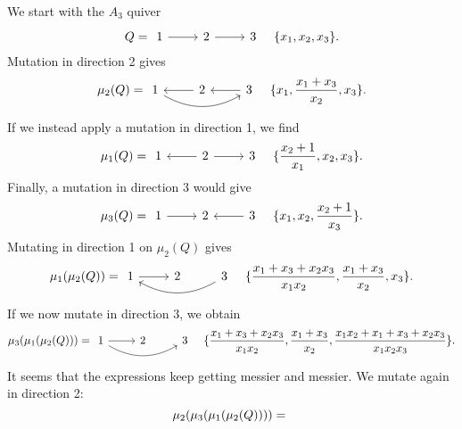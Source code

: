\documentclass{article}
\begin{document}
\begin{example}
	We start with the $A_3$ quiver
	\begin{equation*}
		Q =
		\begin{tikzcd}
			1 \rar[] & 2 \rar[] &3
		\end{tikzcd}
		\quad \{x_1, x_2, x_3\}.
	\end{equation*}
	Mutation in direction 2 gives
	\begin{equation*}
		\mu_2(Q) =
		\begin{tikzcd}
			1 \rar[leftarrow] \ar[rr, bend right] & 2 \rar[leftarrow]& 3
		\end{tikzcd}
		\quad \{x_1, \frac{x_1 + x_3}{x_2}, x_3\}.
	\end{equation*}
	If we instead apply a mutation in direction 1, we find
	\begin{equation*}
		\mu_1(Q) =
		\begin{tikzcd}
			1 \rar[leftarrow] & 2 \rar[]& 3
		\end{tikzcd}
		\quad \{\frac{x_2 + 1}{x_1}, x_2, x_3\}.
	\end{equation*}
	Finally, a mutation in direction 3 would give
	\begin{equation*}
		\mu_3(Q) =
		\begin{tikzcd}
			1 \rar[] & 2 \rar[leftarrow]& 3
		\end{tikzcd}
		\quad \{x_1, x_2, \frac{x_2 + 1}{x_3}\}.
	\end{equation*}
	Mutating in direction 1 on $\mu_2(Q)$ gives
	\begin{equation*}
		\mu_1(\mu_2(Q)) =
		\begin{tikzcd}
			1 \rar[] \ar[rr,leftarrow, bend right] & 2 & 3
		\end{tikzcd}
		\quad \{\frac{x_1 + x_3 + x_2x_3}{x_1x_2}, \frac{x_1 + x_3}{x_2}, x_3\}.
	\end{equation*}
	If we now mutate in direction 3, we obtain
	\begin{equation*}
		\mu_3(\mu_1(\mu_2(Q))) =
		\begin{tikzcd}
			1 \rar[] \ar[rr, bend right] & 2 & 3
		\end{tikzcd}
		\quad \{\frac{x_1 + x_3 + x_2x_3}{x_1x_2}, \frac{x_1 + x_3}{x_2}, \frac{x_1 x_2 + x_1 + x_3 + x_2 x_3}{x_1x_2x_3}\}.
	\end{equation*}
	It seems that the expressions keep getting messier and messier. We mutate again in direction 2:
	\begin{equation*}
		\mu_2(\mu_3(\mu_1(\mu_2(Q)))) =
		\begin{tikzcd}

\end{tikzcd}
\end{equation*}
\end{example}
\end{document}
